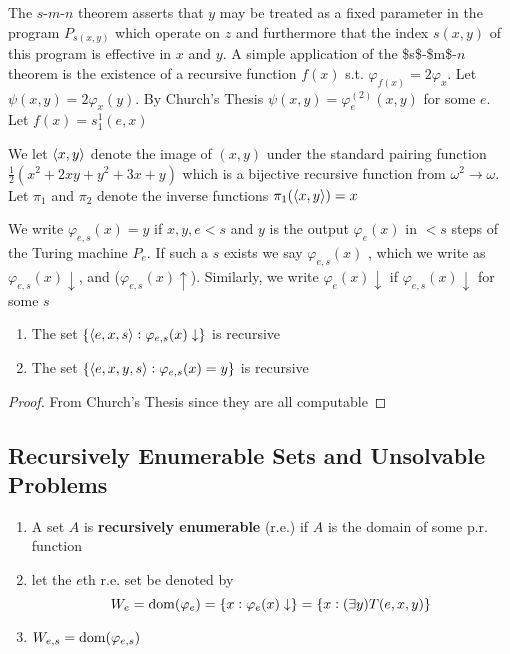\documentclass[11pt]{article}
\begin{document}
The \(s\)-\(m\)-\(n\) theorem asserts that \(y\) may be treated as a fixed parameter
in the program \(P_{s(x,y)}\) which operate on \(z\) and furthermore that the
index \(s(x,y)\) of this program is effective in \(x\) and \(y\). A simple
application of the \$s\$-\$m\$-\(n\) theorem is the existence of a recursive
function \(f(x)\) s.t. \(\varphi_{f(x)}=2\varphi_x\). Let
\(\psi(x,y)=2\varphi_x(y)\). By Church's Thesis
\(\psi(x,y)=\varphi_e^{(2)}(x,y)\) for some \(e\). Let \(f(x)=s^1_1(e,x)\)

We let \(\langle x,y\rangle\) denote the image of \((x,y)\) under the standard pairing
function \(\frac{1}{2}(x^2+2xy+y^2+3x+y)\) which is a bijective recursive
function from \(\omega^2\to\omega\). Let \(\pi_1\) and \(\pi_2\) denote the inverse
functions \(\pi_1(\langle x,y\rangle)=x\)

\begin{definition}[]
We write \(\varphi_{e,s}(x)=y\) if \(x,y,e<s\) and \(y\) is the output
\(\varphi_e(x)\) in \(<s\) steps of the Turing machine \(P_e\). If such a \(s\)
exists we say \(\varphi_{e,s}(x)\) , which we write as 
\(\varphi_{e,s}(x)\downarrow\), and  (\(\varphi_{e,s}(x)\uparrow\)).
Similarly, we write \(\varphi_e(x)\downarrow\) if \(\varphi_{e,s}(x)\downarrow\)
for some \(s\)
\end{definition}

\begin{theorem}[]
\begin{enumerate}
\item The set \(\{\langle e,x,s\rangle:\varphi_{e,s}(x)\downarrow\}\) is recursive
\item The set \(\{\langle e,x,y,s\rangle:\varphi_{e,s}(x)=y\}\) is recursive
\end{enumerate}
\end{theorem}
\begin{proof}
From Church's Thesis since they are all computable
\end{proof}
\subsection{Recursively Enumerable Sets and Unsolvable Problems}
\label{sec:orge38b491}
\begin{definition}[]
\begin{enumerate}
\item A set \(A\) is \textbf{recursively enumerable} (r.e.) if \(A\) is the domain of
some p.r. function
\item let the \(e\)th r.e. set be denoted by
\begin{equation*}
W_e=\mathrm{dom}{(\varphi_e)}=\{x:\varphi_e(x)\downarrow\}=\{x:(\exists y)T(e,x,y)\}
\end{equation*}
\item \(W_{e,s}=\mathrm{dom}{(\varphi_{e,s})}\)
\end{enumerate}
\end{definition}
\end{document}

